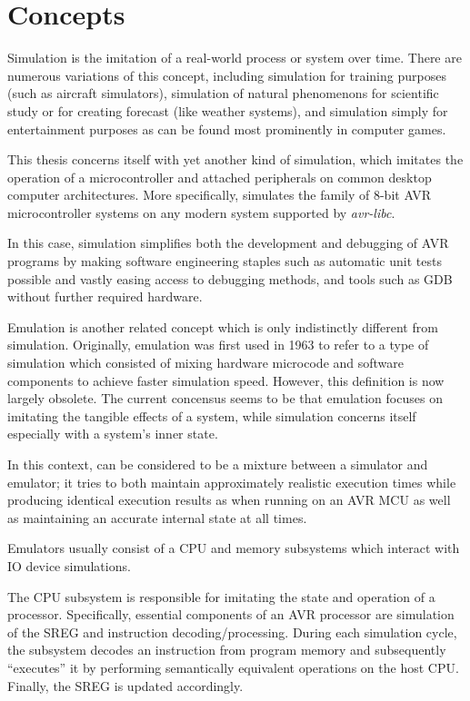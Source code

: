 
\chapter{Concepts} \label{chapter:concepts}

Simulation is the imitation of a real-world process or system over time\cite{wiki:simulation}.
There are numerous variations of this concept, including simulation for training purposes
(such as aircraft simulators), simulation of natural phenomenons for scientific study
or for creating forecast (like weather systems), and simulation simply for entertainment purposes
as can be found most prominently in computer games.

This thesis concerns itself with yet another kind of simulation, which imitates
the operation of a microcontroller and attached peripherals on common desktop computer architectures. More
specifically, \simavr simulates the family of 8-bit \ac{AVR} microcontroller systems
on any modern system supported by \emph{avr-libc}.

In this case, simulation simplifies both the development and debugging of \ac{AVR}
programs by making software engineering staples such as automatic unit tests possible
and vastly easing access to debugging methods, and tools such as \ac{GDB} without further
required hardware.

Emulation is another related concept which is only indistinctly different from
simulation. Originally, emulation was first used in 1963 to refer to a type
of simulation which consisted of mixing hardware microcode and software components
to achieve faster simulation speed\cite{building_ibm}. However, this definition is now
largely obsolete. The current concensus seems to be that emulation focuses on imitating
the tangible effects of a system, while simulation concerns itself especially with
a system's inner state.

In this context, \simavr can be considered to be a mixture between a simulator and
emulator; it tries to both maintain approximately realistic execution times while
producing identical execution results as when running on an \ac{AVR} \ac{MCU} as
well as maintaining an accurate internal state at all times.

Emulators usually consist of a \ac{CPU} and memory subsystems which interact with
\ac{IO} device simulations\cite{wiki:emulation}.

The \ac{CPU} subsystem is responsible
for imitating the state and operation of a processor. Specifically, essential components of an \ac{AVR}
processor are simulation of the \ac{SREG} and instruction decoding/processing.
During each simulation cycle, the subsystem decodes an instruction from program memory
and subsequently ``executes'' it by performing semantically equivalent operations on
the host \ac{CPU}. Finally, the \ac{SREG} is updated accordingly.

